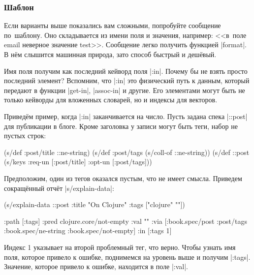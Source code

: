 \subsubsection{Шаблон}


Если варианты выше показались вам сложными, попробуйте сообщение по~шаблону. Оно
складывается из имени поля и значения, например: <<в~поле email неверное
значение test>>. Сообщение легко получить функцией \spverb|format|. В н\"{е}м
слышится машинная природа, зато способ быстрый и деш\"{е}вый.

Имя поля получим как последний кейворд поля \spverb|:in|. Почему бы не взять
просто последний элемент? Вспомним, что \spverb|:in| это физический путь к
данным, который передают в функции \spverb|get-in|, \spverb|assoc-in| и
другие. Его элементами могут быть не только кейворды для вложенных словарей, но
и индексы для векторов.

Привед\"{е}м пример, когда \spverb|:in| заканчивается на число. Пусть задана
спека \spverb|::post| для публикации в блоге. Кроме заголовка у записи могут
быть теги, набор не пустых строк:

\begin{english}
  \begin{clojure}
(s/def :post/title ::ne-string)
(s/def :post/tags (s/coll-of ::ne-string))
(s/def ::post (s/keys :req-un [:post/title]
                      :opt-un [:post/tags]))
  \end{clojure}
\end{english}

Предположим, один из тегов оказался пустым, что не имеет смысла. Приведем
сокращ\"{е}нный отч\"{е}т \spverb|s/explain-data|:

\begin{english}
  \begin{clojure}
(s/explain-data ::post {:title "On Clojure"
                        :tags ["clojure" ""]})

{:path [:tags]
 :pred clojure.core/not-empty
 :val ""
 :via [:book.spec/post
       :post/tags
       :book.spec/ne-string
       :book.spec/not-empty]
 :in [:tags 1]}
  \end{clojure}
\end{english}

Индекс 1 указывает на второй проблемный тег, что верно. Чтобы узнать имя поля,
которое привело к ошибке, поднимемся на уровень выше и получим \spverb|:tags|.
Значение, которое привело к ошибке, находится в поле \spverb|:val|.

